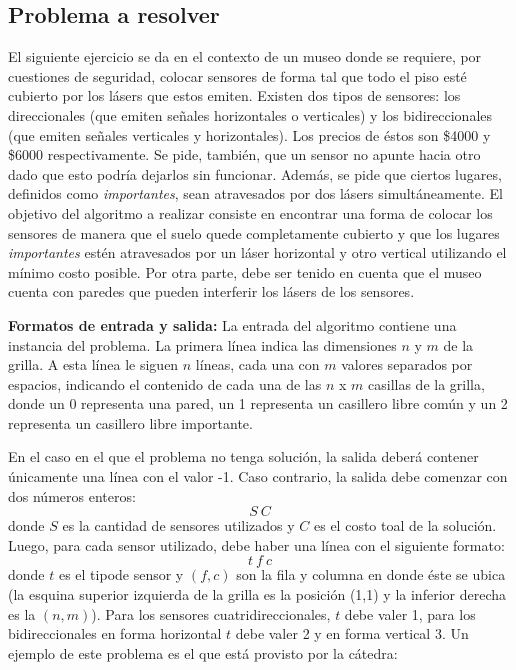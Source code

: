 \subsection{Problema a resolver}

El siguiente ejercicio se da en el contexto de un museo donde se requiere, por cuestiones de seguridad, colocar sensores de forma tal que todo el piso esté cubierto por los lásers que estos emiten. Existen dos tipos de sensores: los direccionales (que emiten señales horizontales o verticales) y los bidireccionales (que emiten señales verticales y horizontales). Los precios de éstos son \$4000 y \$6000 respectivamente. Se pide, también, que un sensor no apunte hacia otro dado que esto podría dejarlos sin funcionar. Además, se pide que ciertos lugares, definidos como \textit{importantes}, sean atravesados por dos lásers simultáneamente. El objetivo del algoritmo a realizar consiste en encontrar una forma de colocar los sensores de manera que el suelo quede completamente cubierto y que los lugares \textit{importantes} estén atravesados por un láser horizontal y otro vertical utilizando el mínimo costo posible. Por otra parte, debe ser tenido en cuenta que el museo cuenta con paredes que pueden interferir los lásers de los sensores.\newline

\newline
\textbf {Formatos de entrada y salida:}\newline
\newline
La entrada del algoritmo contiene una instancia del problema. La primera línea indica las dimensiones $n$ y $m$ de la grilla. A esta línea le siguen $n$ líneas, cada una con $m$ valores separados por espacios, indicando el contenido de cada una de las $n$ x $m$ casillas de la grilla, donde un 0 representa una pared, un 1 representa un casillero libre común y un 2 representa un casillero libre importante.\newline

En el caso en el que el problema no tenga solución, la salida deberá contener únicamente una línea con el valor -1. Caso contrario, la salida debe comenzar con dos números enteros: 
$$S\ C$$ 
donde $S$ es la cantidad de sensores utilizados y $C$ es el costo toal de la solución. Luego, para cada sensor utilizado, debe haber una línea con el siguiente formato: 
$$t\ f\ c$$ 
donde $t$ es el tipode sensor y $(f,c)$ son la fila y columna en donde éste se ubica (la esquina superior izquierda de la grilla es la posición (1,1) y la inferior derecha es la $(n,m)$). Para los sensores cuatridireccionales, $t$ debe valer 1, para los bidireccionales en forma horizontal $t$ debe valer 2 y en forma vertical 3.\newline
\newline
Un ejemplo de este problema es el que está provisto por la cátedra:

